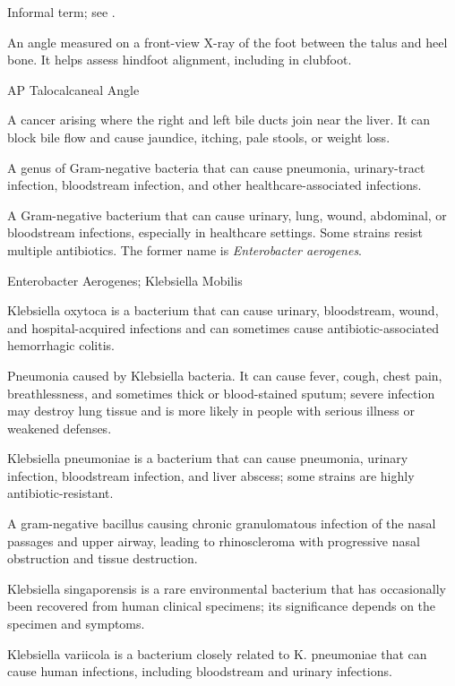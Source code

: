  Informal term; see .

 An angle measured on a front-view X-ray of the foot between the talus and heel bone. It helps assess hindfoot alignment, including in clubfoot.

\synonyms
AP Talocalcaneal Angle

 A cancer arising where the right and left bile ducts join near the liver. It can block bile flow and cause jaundice, itching, pale stools, or weight loss.

 A genus of Gram-negative bacteria that can cause pneumonia, urinary-tract infection, bloodstream infection, and other healthcare-associated infections.

 A Gram-negative bacterium that can cause urinary, lung, wound, abdominal, or bloodstream infections, especially in healthcare settings. Some strains resist multiple antibiotics. The former name is \textit{Enterobacter aerogenes}.

\synonyms
Enterobacter Aerogenes; Klebsiella Mobilis

 Klebsiella oxytoca is a bacterium that can cause urinary, bloodstream, wound, and hospital-acquired infections and can sometimes cause antibiotic-associated hemorrhagic colitis.

 Pneumonia caused by Klebsiella bacteria. It can cause fever, cough, chest pain, breathlessness, and sometimes thick or blood-stained sputum; severe infection may destroy lung tissue and is more likely in people with serious illness or weakened defenses.

 Klebsiella pneumoniae is a bacterium that can cause pneumonia, urinary infection, bloodstream infection, and liver abscess; some strains are highly antibiotic-resistant.

 A gram-negative bacillus causing chronic granulomatous infection of the nasal passages
and upper airway, leading to rhinoscleroma with progressive nasal obstruction and tissue
destruction.

 Klebsiella singaporensis is a rare environmental bacterium that has occasionally been recovered from human clinical specimens; its significance depends on the specimen and symptoms.

 Klebsiella variicola is a bacterium closely related to K. pneumoniae that can cause human infections, including bloodstream and urinary infections.

